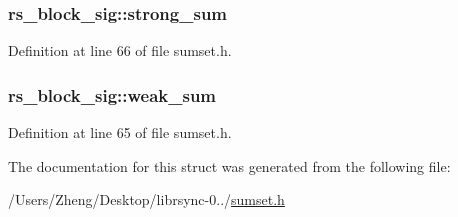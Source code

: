 \subsubsection[{strong\+\_\+sum}]{ rs\+\_\+block\+\_\+sig\+::strong\+\_\+sum}\label{structrs__block__sig_a4728e761088b574b4803737ccd7cff7f}


Definition at line 66 of file sumset.\+h.

\hypertarget{structrs__block__sig_a7674e2cd7ea31db3347e6465dbcb35ce}{}
\subsubsection[{weak\+\_\+sum}]{ rs\+\_\+block\+\_\+sig\+::weak\+\_\+sum}\label{structrs__block__sig_a7674e2cd7ea31db3347e6465dbcb35ce}


Definition at line 65 of file sumset.\+h.



The documentation for this struct was generated from the following file\+:\begin{DoxyCompactItemize}
\item 
/\+Users/\+Zheng/\+Desktop/librsync-\/0../\hyperlink{sumset_8h}{sumset.\+h}\end{DoxyCompactItemize}

